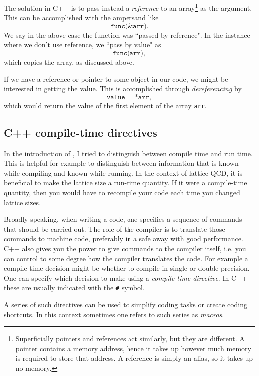 The solution in C++ is to pass instead a {\it reference} to an 
array\footnote{Superficially pointers and references act similarly, but they are
different. A pointer contains a memory address, hence it takes up however much
memory is required to store that address. A reference is simply an alias, so it
takes up no memory.} as the argument. This can be accomplished with the
ampersand like
\begin{equation*}
\texttt{func(\&arr)}.
\end{equation*}
We say in the above case the function was ``passed by reference". In the
instance where we don't use reference, we ``pass by value" as
\begin{equation*}
\texttt{func(arr)},
\end{equation*}
which copies the array, as discussed above.

If we have a reference or pointer to some object in our code, we might be interested in
getting the value. This is accomplished through {\it
dereferencing} by
\begin{equation*}
\texttt{value = *arr},
\end{equation*}
which would return the value of the first element of the array \texttt{arr}.

\subsection{C++ compile-time directives}

In the introduction of , I tried to distinguish between compile time
and run time. This is helpful for example to distinguish between information
that is known while compiling and known while running. In the context of lattice
QCD, it is beneficial to make the lattice size a run-time quantity. If it were a
compile-time quantity, then you would have to recompile your code each time you
changed lattice sizes.

Broadly speaking, when writing a code, one specifies a sequence of commands that
should be carried out. The role of the compiler is to translate those commands
to machine code, preferably in a safe away with good performance. C++ also gives
you the power to give commands to the compiler itself, i.e. you can control to
some degree how the compiler translates the code. For example a compile-time
decision might be whether to compile in single or double precision. One can
specify which decision to make using a {\it compile-time
directive}.
In C++ these are usually indicated with the \texttt{\#} symbol.

A series of such directives can be used to simplify coding tasks or create
coding shortcuts. In this context sometimes one refers to such series as {\it
macros}.



